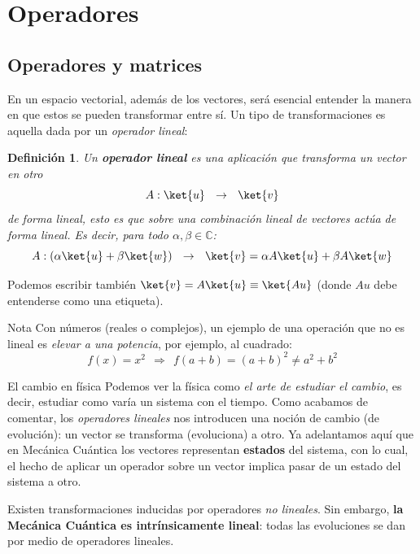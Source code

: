 \documentclass[a4paper,11pt]{book} %
\newtheorem{definicion_contador}{Definición}
\newcommand{\Definicion}[1]{
		\begin{mybox_gray2}{}
			\begin{definicion_contador}
				 #1 
			\end{definicion_contador} 
		\end{mybox_gray2}
	}
\numberwithin{equation}{chapter}
\begin{document}
	
	\section{Operadores}




		\subsection{Operadores y matrices}

En un espacio vectorial, además de los vectores, será esencial entender la manera en que estos se pueden transformar entre sí. Un tipo de transformaciones es aquella dada por un \textit{operador lineal}:
	\Definicion{
	Un \textbf{operador lineal }es una aplicación  que transforma un vector  en otro 
	\begin{equation}
	A: \ket{u} ~~\to ~~ \ket{v} 
	\end{equation}
de forma \textit{lineal}, esto es que sobre una \textit{combinación lineal} de vectores actúa de forma lineal. Es decir, para todo $\alpha,\beta \in {\mathbb C}$: 
	\begin{equation}
	A: (\alpha\ket{u} + \beta\ket{w})~~\to ~~ \ket{v} =\alpha A\ket{u} + \beta A\ket{w}
	\end{equation}   
	}
Podemos escribir también $\ket{v} = A\ket{u} \equiv \ket{Au}$ (donde $Au$ debe entenderse como una etiqueta).

\begin{mybox_blue}{Nota}
Con números (reales o complejos), un ejemplo de una operación que no es lineal es \textit{elevar a una potencia}, por ejemplo, al cuadrado:
	\begin{equation}
	f(x) = x^2 ~~ \Rightarrow ~~ f(a+b) = (a+b)^2 \neq a^2 + b^2
	\end{equation}
\end{mybox_blue}

	\begin{mybox_blue}{El cambio en física}
	Podemos ver la física como \textit{el arte de estudiar el cambio}, es decir, estudiar como varía un sistema con el tiempo. Como acabamos de comentar, los \textit{operadores lineales} nos introducen una noción de cambio (de evolución): un vector se transforma (evoluciona) a otro. Ya adelantamos aquí que en Mecánica Cuántica los vectores representan \textbf{estados} del sistema, con lo cual, el hecho de aplicar un operador sobre un vector implica pasar de un estado del sistema a otro. 
	\vspace{0.3cm}
	
	Existen transformaciones inducidas por operadores \textit{no lineales}. Sin embargo, \textbf{la Mecánica Cuántica es intrínsicamente lineal}: todas las evoluciones se dan por medio de operadores lineales.
	\end{mybox_blue}
\end{document}
